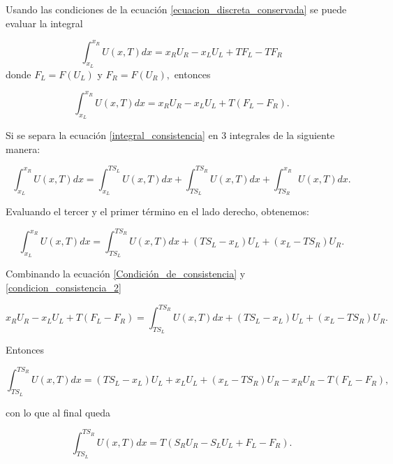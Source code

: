 \documentclass[12pt,a4paper]{book}
\begin{document}
\noindent Usando las condiciones de la ecuación \ref{ecuacion_discreta_conservada} se puede evaluar la integral

\begin{equation*}
\int_{x_L}^{x_R} U\left( x, T \right) dx = 
x_R U_R -x_L U_L+T F_L-T F_R
\end{equation*}
donde $F_L = F \left( U_L \right)$ y $F_R = F \left( U_R \right),$ 
entonces

\begin{equation}\label{Condición_de_consistencia}
\int_{x_L}^{x_R} U\left( x, T \right) dx = 
x_R U_R -x_L U_L+T \left( F_L- F_R \right).
\end{equation}

\noindent Si se separa la ecuación \ref{integral_consistencia} en 3 integrales de la siguiente manera:

\begin{equation}
\int_{x_L}^{x_R} U\left( x, T \right) dx = 
\int_{x_L}^{T S_L} U \left(x, T \right)dx+
\int_{T S_L}^{T S_R} U \left(x, T \right)dx+
\int_{T S_R}^{x_R} U \left(x, T \right)dx.
\end{equation}

\noindent Evaluando el tercer y el primer término en el lado derecho, obtenemos:

\begin{equation}\label{condicion_consistencia_2}
\int_{x_L}^{x_R} U\left( x, T \right) dx =
\int_{T S_L}^{T S_R} U \left(x, T \right)dx+
\left( T S_L - x_L \right) U_L+
\left( x_L - T S_R \right) U_R.
\end{equation}

\noindent Combinando la ecuación \ref{Condición_de_consistencia} y 
\ref{condicion_consistencia_2}

\begin{equation*}
x_R U_R -x_L U_L+T \left( F_L- F_R \right) =
\int_{T S_L}^{T S_R} U \left(x, T \right)dx+
\left( T S_L - x_L \right) U_L+
\left( x_L - T S_R \right) U_R.
\end{equation*}

\noindent Entonces 

\begin{equation*}
\int_{T S_L}^{T S_R} U \left(x, T \right)dx=
\left( T S_L - x_L \right) U_L+ x_L U_L +
\left( x_L - T S_R \right) U_R-x_R U_R -
T \left( F_L- F_R \right),
\end{equation*}

\noindent con lo que al final queda

\begin{equation} \label{ull_sin_promedio}
\int_{T S_L}^{T S_R} U \left(x, T \right)dx=
T \left( S_R U_R - S_L U_L + F_L - F_R \right).
\end{equation}
\end{document}
